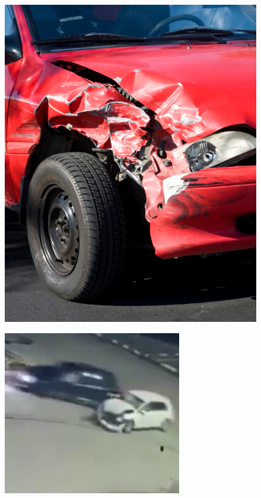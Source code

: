 \documentclass[ 12pt,a4paper,twocolumn,fleqn]{article}
\begin{document}
\begin{adjustwidth}{3.5em}{0pt}
\begin{figure}[H]
\begin{center}
    \hspace*{0.4in}
    \includegraphics[scale=1]{media/acc2.jpg}
        
    \hspace{0.1cm}
\end{center}
\end{figure}
\begin{figure}[H]
\begin{center}
    
    \hspace*{0.4in}
    \includegraphics[scale=0.6]{media/acc3.jpg}
    

\end{center}
\end{figure}
\end{adjustwidth}
\end{document}
